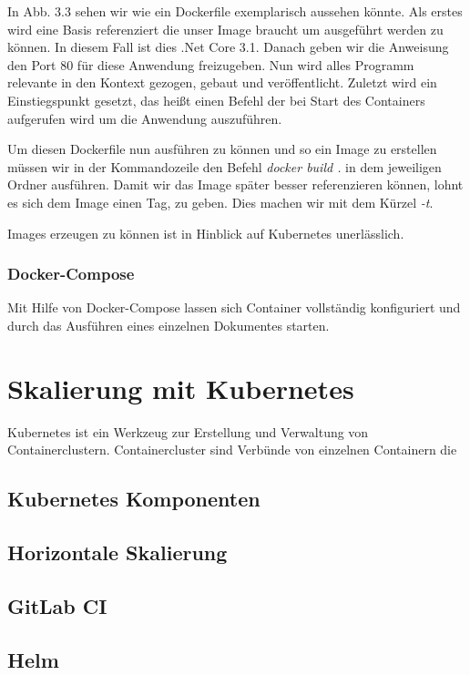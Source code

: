 \documentclass[12pt,a4paper]{scrartcl}
\begin{document}
In Abb. 3.3 sehen wir wie ein Dockerfile exemplarisch aussehen könnte. Als erstes wird eine Basis referenziert die unser Image braucht um ausgeführt werden zu können. In diesem Fall ist dies .Net Core 3.1. Danach geben wir die Anweisung den Port 80 für diese Anwendung freizugeben. Nun wird alles Programm relevante in den Kontext gezogen, gebaut und veröffentlicht. Zuletzt wird ein Einstiegspunkt gesetzt, das heißt einen Befehl der bei Start des Containers aufgerufen wird um die Anwendung auszuführen. 

Um diesen Dockerfile nun ausführen zu können und so ein Image zu erstellen müssen wir in der Kommandozeile den Befehl \emph{docker build .} in dem jeweiligen Ordner ausführen. Damit wir das Image später besser referenzieren können, lohnt es sich dem Image einen Tag, zu geben. Dies machen wir mit dem Kürzel \emph{-t}.

Images erzeugen zu können ist in Hinblick auf Kubernetes unerlässlich.

\subsubsection{Docker-Compose}

Mit Hilfe von Docker-Compose lassen sich Container vollständig konfiguriert und durch das Ausführen eines einzelnen Dokumentes starten. 

\section{Skalierung mit Kubernetes} \label{kubernetes}
Kubernetes ist ein Werkzeug zur Erstellung und Verwaltung von Containerclustern. Containercluster sind Verbünde von einzelnen Containern die 

\subsection{Kubernetes Komponenten}

\subsection{Horizontale Skalierung}

\subsection{GitLab CI}

\subsection{Helm}
\end{document}

